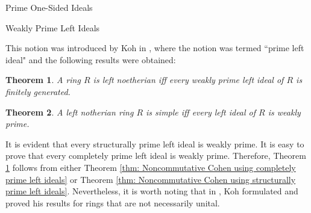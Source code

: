 \documentclass[11pt,a4paper]{article}
\theoremstyle{theorem}
\newtheorem{theorem}{Theorem}[section]
\numberwithin{equation}{section}
\begin{document}
\begin{section}{Prime One-Sided Ideals}
\begin{subsection}{Weakly Prime Left Ideals}
	
	This notion was introduced by Koh in \cite{koh1971prime}, where the notion was termed ``prime left ideal" and the following results were obtained:
	\begin{theorem}\label{thm: Noncommutative Cohen using weakly prime left ideals}
		A ring \( R \) is left noetherian iff every weakly prime left ideal of  \( R \)  is finitely generated. 
	\end{theorem} 
	\begin{theorem}\label{thm: simplicity using weakly prime left ideals}
		A left notherian ring \( R \) is simple iff every left ideal of \( R \) is weakly prime.  
	\end{theorem} 
	It is evident that every structurally prime left ideal is weakly prime. It is easy to prove that every completely prime left ideal is weakly prime. Therefore, Theorem \ref{thm: Noncommutative Cohen using weakly prime left ideals} follows from either Theorem \ref{thm: Noncommutative Cohen using completely prime left ideals} or Theorem \ref{thm: Noncommutative Cohen using structurally prime left ideals}. Nevertheless, it is worth noting that in \cite{koh1971prime}, Koh formulated and proved his results for rings that are not necessarily unital.   
	

\end{subsection}
\end{section}
\end{document}
